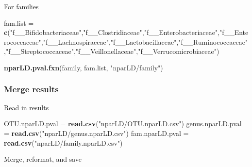 \documentclass[]{article}
\newenvironment{Shaded}{\begin{snugshade}}{\end{snugshade}}
\newcommand{\KeywordTok}[1]{\textcolor[rgb]{0.13,0.29,0.53}{\textbf{#1}}}
\newcommand{\DataTypeTok}[1]{\textcolor[rgb]{0.13,0.29,0.53}{#1}}
\newcommand{\StringTok}[1]{\textcolor[rgb]{0.31,0.60,0.02}{#1}}
\newcommand{\OtherTok}[1]{\textcolor[rgb]{0.56,0.35,0.01}{#1}}
\newcommand{\OperatorTok}[1]{\textcolor[rgb]{0.81,0.36,0.00}{\textbf{#1}}}
\newcommand{\NormalTok}[1]{#1}
\begin{document}
For families

\begin{Shaded}
\begin{Highlighting}[]
\NormalTok{fam.list =}\StringTok{ }\KeywordTok{c}\NormalTok{(}\StringTok{"f__Bifidobacteriaceae"}\NormalTok{,}\StringTok{"f__Clostridiaceae"}\NormalTok{,}\StringTok{"f__Enterobacteriaceae"}\NormalTok{,}\StringTok{"f__Enterococcaceae"}\NormalTok{,}\StringTok{"f__Lachnospiraceae"}\NormalTok{,}\StringTok{"f__Lactobacillaceae"}\NormalTok{,}\StringTok{"f__Ruminococcaceae"}\NormalTok{,}\StringTok{"f__Streptococcaceae"}\NormalTok{,}\StringTok{"f__Veillonellaceae"}\NormalTok{,}\StringTok{"f__Verrucomicrobiaceae"}\NormalTok{)}

\KeywordTok{nparLD.pval.fxn}\NormalTok{(family, fam.list, }\StringTok{"nparLD/family"}\NormalTok{)}
\end{Highlighting}
\end{Shaded}

\subsubsection{Merge results}\label{merge-results}

Read in results

\begin{Shaded}
\begin{Highlighting}[]
\NormalTok{OTU.nparLD.pval =}\StringTok{ }\KeywordTok{read.csv}\NormalTok{(}\StringTok{"nparLD/OTU.nparLD.csv"}\NormalTok{)}
\NormalTok{genus.nparLD.pval =}\StringTok{ }\KeywordTok{read.csv}\NormalTok{(}\StringTok{"nparLD/genus.nparLD.csv"}\NormalTok{)}
\NormalTok{fam.nparLD.pval =}\StringTok{ }\KeywordTok{read.csv}\NormalTok{(}\StringTok{"nparLD/family.nparLD.csv"}\NormalTok{)}
\end{Highlighting}
\end{Shaded}

Merge, reformat, and save

\begin{Shaded}
\end{Shaded}
\end{document}
